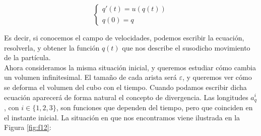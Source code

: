 \begin{equation}\label{eq:ec1}
    \begin{cases}
        q'(t) = u(q(t)) \\
        q(0) = q
    \end{cases}
\end{equation}

Es decir, si conocemos el campo de velocidades, podemos escribir la ecuación, resolverla, y obtener la función $q(t)$
que nos describe el susodicho movimiento de la partícula. \\

Ahora consideramos la misma situación inicial, y queremos estudiar cómo cambia un volumen infinitesimal.
El tamaño de cada arista será $\varepsilon$, y queremos ver cómo se deforma el volumen del cubo con el tiempo.
Cuando podamos escribir dicha ecuación aparecerá de forma natural el concepto de divergencia. Las longitudes $a_q^i$, con
$i \in \{1,2,3\}$, son funciones que dependen del tiempo, pero que coinciden en el instante inicial. La situación en que nos 
encontramos viene ilustrada en la Figura \ref{fig:f12}:

